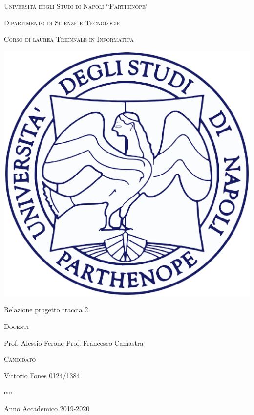\documentclass[12pt,italian,a4paper,oneside,openright]{book}
\begin{document}
{
    \thispagestyle{empty}
    
    \vskip 1cm \large \centerline{\textsc{Universit\`a degli Studi di
    Napoli ``Parthenope''}}
    
    \centerline {\textsc{Dipartimento di Scienze e Tecnologie}}
    
    \centerline {\small\textsc{Corso di laurea Triennale in Informatica}}
    \vskip 0.5cm

    \begin{center}
    \includegraphics[scale=0.8]{img/logo.eps}
    \end{center}
    
    \vskip 0.5cm
    
    \large {}
    
    \vskip 0.5cm
    
    \centerline {Relazione progetto traccia 2}
    
    \vskip 0.5cm

    \large
    \begin{minipage}[t]{7cm}
    \textsc{Docenti}
    
    Prof. Alessio Ferone\newline
    Prof. Francesco Camastra
    
    \end{minipage}
    \hfill
    \begin{minipage}[t]{6cm}
    \hfill \textsc{Candidato}
    
    \hfill Vittorio Fones 0124/1384
    \end{minipage}
    
     cm \Large \centerline {Anno Accademico 2019-2020}
    \vfill \eject
} %
\end{document}
